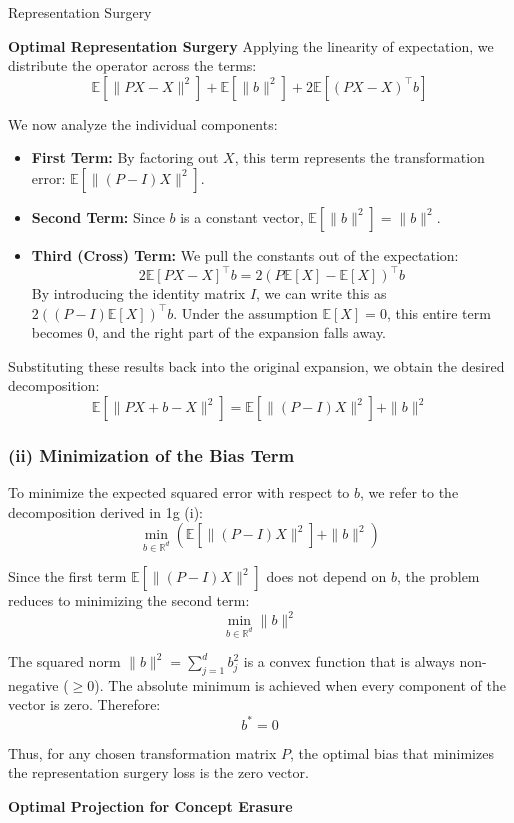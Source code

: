 \begin{question}{Representation Surgery}
\begin{subquestion}{\textbf{Optimal Representation Surgery}}
Applying the linearity of expectation, we distribute the operator across the terms:
$$\mathbb{E}[\|PX - X\|^2] + \mathbb{E}[\|b\|^2] + 2\mathbb{E}[(PX - X)^\top b]$$

We now analyze the individual components:
\begin{itemize}
    \item \textbf{First Term:} By factoring out $X$, this term represents the transformation error: $\mathbb{E}[\|(P-I)X\|^2]$.
    \item \textbf{Second Term:} Since $b$ is a constant vector, $\mathbb{E}[\|b\|^2] = \|b\|^2$.
    \item \textbf{Third (Cross) Term:} We pull the constants out of the expectation:
    $$2\mathbb{E}[PX - X]^\top b = 2(P\mathbb{E}[X] - \mathbb{E}[X])^\top b$$
    By introducing the identity matrix $I$, we can write this as $2((P - I)\mathbb{E}[X])^\top b$. Under the assumption $\mathbb{E}[X] = 0$, this entire term becomes $0$, and the right part of the expansion falls away.
\end{itemize}

Substituting these results back into the original expansion, we obtain the desired decomposition:
$$\mathbb{E}[\|PX + b - X\|^2] = \mathbb{E}[\|(P-I)X\|^2] + \|b\|^2$$
\subsubsection*{(ii) Minimization of the Bias Term}

To minimize the expected squared error with respect to $b$, we refer to the decomposition derived in 1g (i):
$$\min_{b \in \mathbb{R}^d} \left( \mathbb{E}[\|(P-I)X\|^2] + \|b\|^2 \right)$$

Since the first term $\mathbb{E}[\|(P-I)X\|^2]$ does not depend on $b$, the problem reduces to minimizing the second term:
$$\min_{b \in \mathbb{R}^d} \|b\|^2$$

The squared norm $\|b\|^2 = \sum_{j=1}^d b_j^2$ is a convex function that is always non-negative ($\ge 0$). The absolute minimum is achieved when every component of the vector is zero. Therefore:
$$b^* = 0$$

Thus, for any chosen transformation matrix $P$, the optimal bias that minimizes the representation surgery loss is the zero vector.
\end{subquestion}

\begin{subquestion}{\textbf{Optimal Projection for Concept Erasure}}


\end{subquestion}
\end{question}
